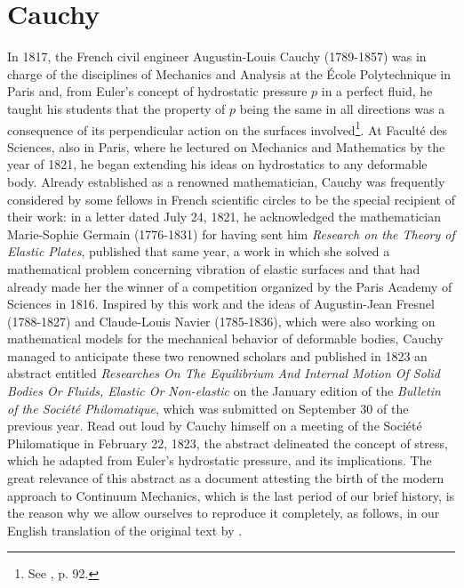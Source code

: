 \section{Cauchy}

In 1817, the French civil engineer Augustin-Louis Cauchy (1789-1857) was in charge of the disciplines of Mechanics and Analysis at the \'Ecole Polytechnique in Paris and, from Euler's concept of hydrostatic pressure $p$ in a perfect fluid, he taught his students that the property of $p$ being the same in all directions was a consequence of its perpendicular action on the surfaces involved\footnote{See \cite{belhoste_1991_1}, p. 92.}. At Facult\'e des Sciences, also in Paris, where he lectured on Mechanics and Mathematics by the year of 1821, he began extending his ideas on hydrostatics to any deformable body. Already established as a renowned mathematician, Cauchy was frequently considered by some fellows in French scientific circles to be the special recipient of their work: in a letter dated July 24, 1821, he acknowledged the mathematician Marie-Sophie Germain (1776-1831) for having sent him \emph{Research on the Theory of Elastic Plates}, published that same year, a work in which she solved a mathematical problem concerning vibration of elastic surfaces and that had already made her the winner of a competition organized by the Paris Academy of Sciences in 1816. Inspired by this work and the ideas of Augustin-Jean Fresnel (1788-1827) and Claude-Louis Navier (1785-1836), which were also working on mathematical models for the mechanical behavior of deformable bodies, Cauchy managed to anticipate these two renowned scholars and published in 1823 an abstract entitled \emph{Researches On The Equilibrium And Internal Motion Of Solid Bodies Or Fluids, Elastic Or Non-elastic} on the January edition of the \emph{Bulletin of the Soci\'et\'e Philomatique}, which was submitted on September 30 of the previous year. Read out loud by Cauchy himself on a meeting of the Soci\'et\'e Philomatique in February 22, 1823, the abstract delineated the concept of stress, which he adapted from Euler's hydrostatic pressure, and its implications. The great relevance of this abstract as a document attesting the birth of the modern approach to Continuum Mechanics, which is the last period of our brief history, is the reason why we allow ourselves to reproduce it completely, as follows, in our English translation of the original text by \cite{cauchy_1823}.



